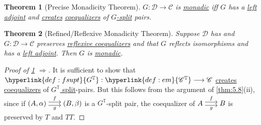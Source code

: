 \documentclass{article}
\newenvironment{tikzcdi}{\begin{tikzcd}[cramped, sep=scriptsize]}{\end{tikzcd}}
\let\to\longrightarrow
\newtheorem{nthm}{Theorem}[section]
\begin{document}
\begin{nthm}[Precise Monadicity Theorem]\label{thm:5.12}
  $G: \mathscr{D} \to \mathscr{C}$ is \hyperlink{def:monadic}{monadic} iff $G$ has a \hyperlink{def:adj}{left adjoint} and \hyperlink{def:clim}{creates} \hyperlink{def:equalizer}{coequalizers} of \hyperlink{def:gsplit}{$G$-split} pairs.
\end{nthm}
\begin{nthm}[Refined/Reflexive Monadicity Theorem]\label{thm:5.13}
  Suppose $\mathscr{D}$ has and $G: \mathscr{D} \to \mathscr{C}$ preserves \hyperlink{def:reflexive}{reflexive coequalizers} and that $G$ reflects isomorphisms and has a \hyperlink{def:adj}{left adjoint}. Then $G$ is \hyperlink{def:monadic}{monadic}.
\end{nthm}
\begin{proof}[Proof of \cref{thm:5.12} $\Rightarrow$]
  It is sufficient to show that $\hyperlink{def:fsupt}{G^\mathbb{T}}: \hyperlink{def:em}{\mathscr{C}^\mathbb{T}}\to\mathscr{C}$ \hyperlink{def:clim}{creates} \hyperlink{def:equalizer}{coequalizers} of \hyperlink{def:gsplit}{$G^\mathbb{T}$ split}-pairs.
   But this follows from the argument of \cref{thm:5.8}(ii), since if $\begin{tikzcdi}(A,\alpha) \rar[shift left]{f} \rar[shift right,']{g} & (B, \beta)\end{tikzcdi}$ is a $G^\mathbb{T}$-split pair, the coequalizer of $\begin{tikzcdi}A \rar[shift left]{f} \rar[shift right,']{g} & B\end{tikzcdi}$ is preserved by $T$ and $TT$.
\end{proof}
\end{document}
